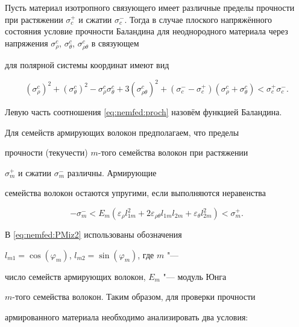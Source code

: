 Пусть материал изотропного связующего имеет различные пределы прочности при растяжении $\sigma^{+}_c$ и сжатии $\sigma^{-}_c.$ Тогда в случае плоского напряжённого состояния условие прочности Баландина для неоднородного материала через напряжения $\sigma_{\rho}^{c}$, $\sigma_{\theta}^{c}$, $\sigma_{\rho\theta}^{c}$    в связующем

для полярной системы координат имеют вид

\begin{equation}

\label{eq:nemfed:proch}

(\sigma_{\rho}^{c})^2+(\sigma_{\theta}^{c})^2-\sigma_{\rho}^{c}\sigma_{\theta}^{c}+3(\sigma_{\rho\theta}^{c})^2+

(\sigma^{-}_c-\sigma^{+}_c)(\sigma_{\rho}^{c}+\sigma_{\theta}^{c})<\sigma^{+}_c\sigma^{-}_c.

\end{equation}

Левую часть соотношения \eqref{eq:nemfed:proch} назовём функцией Баландина. %



Для семейств армирующих волокон предполагаем, что пределы

прочности (текучести) $m$-того семейства волокон при растяжении

$\sigma_{m}^{+}$ и сжатии $\sigma_{m}^{-}$ различны. Армирующие

семейства волокон остаются упругими, если выполняются неравенства

\cite{nemfed:bib:Nd3}

\begin{equation}

\label{eq:nemfed:PMiz2}

-\sigma_{m}^{-}<E_{m}(\varepsilon_{\rho}l_{1m}^2+2\varepsilon_{\rho\theta}l_{1m}l_{2m}+\varepsilon_{\theta}l_{2m}^2)

<\sigma_{m}^{+}.

\end{equation}

В \eqref{eq:nemfed:PMiz2} использованы  обозначения

$l_{m1}=\cos(\varphi_m)$, $l_{m2}=\sin(\varphi_m)$, где $m$ "---

число семейств армирующих волокон, $E_m $ "--- модуль Юнга

$m$-того семейства волокон. Таким образом, для проверки прочности

армированного материала необходимо анализировать  два условия:


